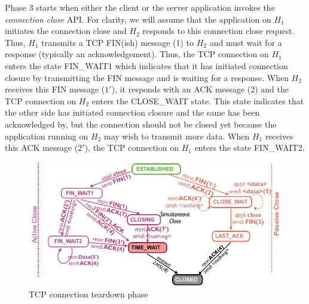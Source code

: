 \begin{multicols}{2}
Phase 3 starts when either the client or the server application invokes the \textit{connection close} API. For clarity, we will assume that the application on $H_{1}$ initiates the connection close and $H_{2}$ responds to this connection close request. Thus, $H_{1}$ transmits a TCP FIN(ish) message (1) to $H_{2}$ and must wait for a response (typically an acknowledgement). Thus, the TCP connection on $H_{1}$ enters the state FIN\_WAIT1 which indicates that it has initiated connection closure by transmitting the FIN message and is waiting for a response. When $H_{2}$ receives this FIN message ($1'$), it responds with an ACK message (2) and the TCP connection on $H_{2}$ enters the CLOSE\_WAIT state. This state indicates that the other side has initiated connection closure and the same has been acknowledged by, but the connection should not be closed yet because the application running on $H_{2}$ may wish to transmit more data. When $H_{1}$ receives this ACK message ($2'$), the TCP connection on $H_{1}$ enters the state FIN\_WAIT2.


\end{multicols}

\begin{figure}[!htb]
\centering
\includegraphics[scale=.55]{src/Figures/chap3/2.jpg}
\caption{TCP connection teardown phase}\label{chap3-fig2}
\end{figure}

